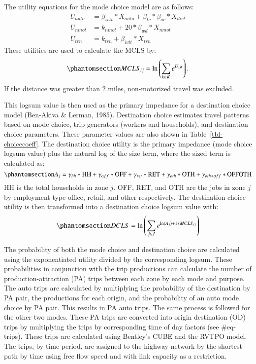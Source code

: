 \documentclass[
  letterpaper,
  number,
  review,
  3p]{elsarticle}
\begin{document}
The utility equations for the mode choice model are as follows: \[
\begin{aligned}
U_{auto} &= \beta_{ivtt} * X_{auto} + \beta_{tc} * \beta_{ac} * X_{dist}\\
U_{nmot} &= k_{nmot} + 20 * \beta_{wd}*X_{nmot}\\
U_{trn} &= k_{trn} + \beta_{ivtt} * X_{trn}
\end{aligned}
\] These utilities are used to calculate the MCLS by:
\begin{equation}\phantomsection\label{eq-mcls}{
MCLS_{ij} = \ln\left(\sum_{k \in K} e^{U_{ijk}}\right).
}\end{equation} If the distance was greater than 2 miles, non-motorized
travel was excluded.

This logsum value is then used as the primary impedance for a
destination choice model (Ben-Akiva \& Lerman, 1985). Destination choice
estimates travel patterns based on mode choice, trip generators (workers
and households), and destination choice parameters. These parameter
values are also shown in Table~\ref{tbl-choicecoeff}. The destination
choice utility is the primary impedance (mode choice logsum value) plus
the natural log of the size term, where the sized term is calculated as:
\begin{equation}\phantomsection\label{eq-dcsizeterm}{
A_j = \gamma_{hh} * \mathrm{HH} + \gamma_{off} * \mathrm{OFF} + \gamma_{ret} * \mathrm{RET} + \gamma_{oth} * \mathrm{OTH} + \\ \gamma_{oth+off} * \mathrm{OFFOTH}
}\end{equation} HH is the total households in zone \(j\). OFF, RET, and
OTH are the jobs in zone \(j\) by employment type office, retail, and
other respectively. The destination choice utility is then transformed
into a destination choice logsum value with:
\begin{equation}\phantomsection\label{eq-dcls}{
DCLS = \ln \left(\sum_{j \in J} e^{\ln(A_j) + 1* MCLS_{ij}}\right)
}\end{equation}

The probability of both the mode choice and destination choice are
calculated using the exponentiated utility divided by the corresponding
logsum. These probabilities in conjunction with the trip productions can
calculate the number of production-attraction (PA) trips between each
zone by each mode and purpose. The auto trips are calculated by
multiplying the probability of the destination by PA pair, the
productions for each origin, and the probability of an auto mode choice
by PA pair. This results in PA auto trips. The same process is followed
for the other two modes. These PA trips are converted into origin
destination (OD) trips by multiplying the trips by corresponding time of
day factors (see \#eq-trips). These trips are calculated using Bentley's
CUBE and the RVTPO model. The trips, by time period, are assigned to the
highway network by the shortest path by time using free flow speed and
with link capacity as a restriction.
\end{document}
